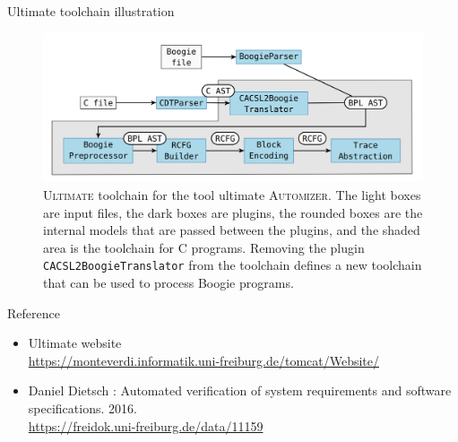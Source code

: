 \documentclass[12pt]{beamer}
\newcommand{\code}[1]{\texttt{#1}}
\newcommand{\ultimate}{\textsc{Ultimate }}
\begin{document}
\captionsetup[figure]{font=scriptsize ,labelfont=scriptsize}
\begin{frame}{Ultimate toolchain illustration}
    \begin{figure}
        \centering
        \includegraphics[scale=0.35]{toolchain.png}
        \caption{\ultimate toolchain for the tool ultimate \textsc{Automizer}. The light boxes are input files, the dark boxes are plugins, the rounded boxes are the internal models that are passed between the plugins, and the shaded area is the toolchain for C programs. Removing the plugin \code{CACSL2BoogieTranslator} from the toolchain defines a new toolchain that can be used to process Boogie programs.
		}
    \end{figure}    
\end{frame}

\begin{frame}{Reference}
	\begin{itemize}
		\item Ultimate website\\
		\url{https://monteverdi.informatik.uni-freiburg.de/tomcat/Website/}
		\item Daniel Dietsch : Automated verification of system requirements and software specifications. 2016.\\
		\url{https://freidok.uni-freiburg.de/data/11159}
	\end{itemize}
\end{frame}
\end{document}
